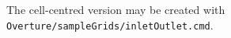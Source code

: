 \documentclass[xcolor=rgb,svgnames,dvipsnames]{article}
\newcommand{\sampleGrids}{Overture/sampleGrids}
\newcommand{\figures}{../fig}
\begin{document}
The cell-centred version may be created with {\tt \sampleGrids/inletOutlet.cmd}.

\clearpage
\end{document}
